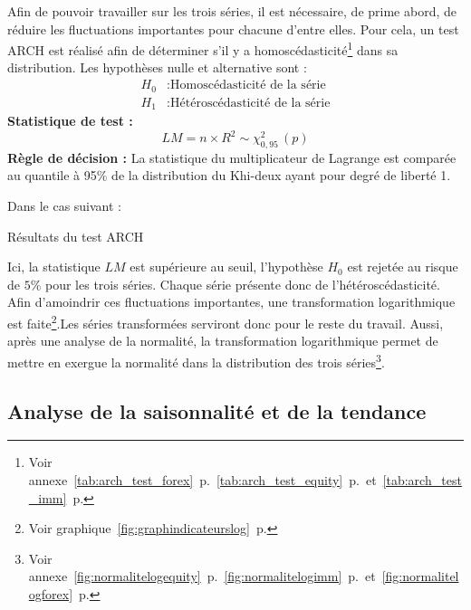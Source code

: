 Afin de pouvoir travailler sur les trois séries, il est nécessaire, de prime abord, de réduire les fluctuations importantes pour chacune d'entre elles. Pour cela, un test ARCH est réalisé afin de déterminer s'il y a homoscédasticité\footnote{Voir annexe~\autoref{tab:arch_test_forex}~p.\pageref{tab:arch_test_forex}~\autoref{tab:arch_test_equity}~p.\pageref{tab:arch_test_equity}~et~\autoref{tab:arch_test_imm}~p.\pageref{tab:arch_test_imm}} dans sa distribution. Les hypothèses nulle et alternative sont :
\begin{equation*}
    \begin{split}
        H_{0} &: \text{Homoscédasticité de la série} \\
        H_{1} &: \text{Hétéroscédasticité de la série}
    \end{split}
\end{equation*}
\textbf{Statistique de test :} 
    \begin{equation*}
        LM = n \times R^{2} \sim \chi^{2}_{0,95} \, (p)
    \end{equation*}
\textbf{Règle de décision :} La statistique du multiplicateur de Lagrange est comparée au quantile à 95\% de la distribution du Khi-deux ayant pour degré de liberté 1.

Dans le cas suivant : 

\begin{table}[H]
    \centering
    \caption{Résultats du test ARCH}
    \sffamily
    
\end{table}

Ici, la statistique $LM$ est supérieure au seuil, l'hypothèse $H_{0}$ est  rejetée au risque de $5\%$ pour les trois séries. Chaque série présente donc de l'hétéroscédasticité. Afin d'amoindrir ces fluctuations importantes, une transformation logarithmique est faite\footnote{Voir graphique~\autoref{fig:graphindicateurslog}~p.\pageref{fig:graphindicateurslog}}.Les séries transformées serviront donc pour le reste du travail. Aussi, après une analyse de la normalité, la transformation logarithmique permet de mettre en exergue la normalité dans la distribution des trois séries\footnote{Voir annexe~\autoref{fig:normalitelogequity}~p.\pageref{fig:normalitelogequity}~\autoref{fig:normalitelogimm}~p.\pageref{fig:normalitelogimm}~et~\autoref{fig:normalitelogforex}~p.\pageref{fig:normalitelogforex}}.

\subsection{Analyse de la saisonnalité et de la tendance}

